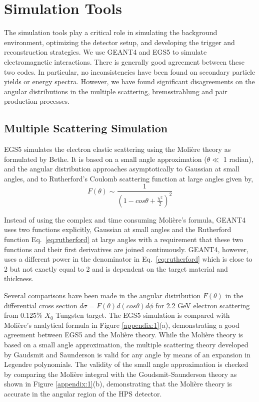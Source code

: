 
\clearpage

\section{Simulation Tools}
\label{app:sim}

The simulation tools play a critical role in simulating the background
environment, optimizing the detector setup, and developing the trigger 
and reconstruction strategies. We use GEANT4 and EGS5 to simulate 
electromagnetic interactions. There is generally good agreement 
between these two codes. In particular, no inconsistencies have been 
found on secondary particle yields or energy spectra. However, we have found 
significant disagreements on the angular distributions in the multiple
scattering, bremsstrahlung and pair production processes.  

\subsection*{Multiple Scattering Simulation}

EGS5 simulates the electron elastic scattering using the Moli\`{e}re theory 
\cite{moliere} as formulated by Bethe. \cite{bethe}
It is based on a small angle approximation
($\theta \ll$ 1 radian), and the angular distribution approaches asymptotically
to Gaussian at small angles, and to Rutherford's Coulomb scattering function at 
large angles given by, 
\begin{equation}
F(\theta) \sim  { \frac{1} {(1-cos\theta + {\frac{\chi^2} {2}})^2}}
\label{eq:rutherford}
\end{equation}

Instead of using the complex and time consuming Moli\`{e}re's formula,
GEANT4 uses two functions explicitly, Gaussian at small angles and the
Rutherford function Eq.~\ref{eq:rutherford} at large angles with a requirement that these two
functions and their first derivatives are joined continuously. 
GEANT4, however, uses a different power
in the denominator in Eq.~\ref{eq:rutherford} which is close to 2 but not exactly equal to 2 and is 
dependent on the target material and thickness.

Several comparisons have been made in the angular distribution $F(\theta)$ in the
differential cross section $d\sigma=F(\theta)d(cos\theta) d\phi$ for 2.2 GeV electron
scattering from 0.125\% $X_0$ Tungsten target. 
The EGS5 simulation is compared with Moli\`{e}re's analytical formula 
in Figure \ref{appendix:1}(a), demonstrating a good agreement between EGS5 and
the Moli\`{e}re theory.
While the Moli\`{e}re theory is based on a small angle approximation,
the multiple scattering theory developed by Gaudsmit and Saunderson is valid 
for any angle by means of an expansion in Legendre polynomials. \cite{gs}
The validity of the small angle approximation is checked by comparing the 
Moli\`{e}re integral with 
the Goudsmit-Saunderson theory as shown in Figure \ref{appendix:1}(b),
demonstrating that the Moli\`{e}re theory is accurate in the angular region
of the HPS detector. 

